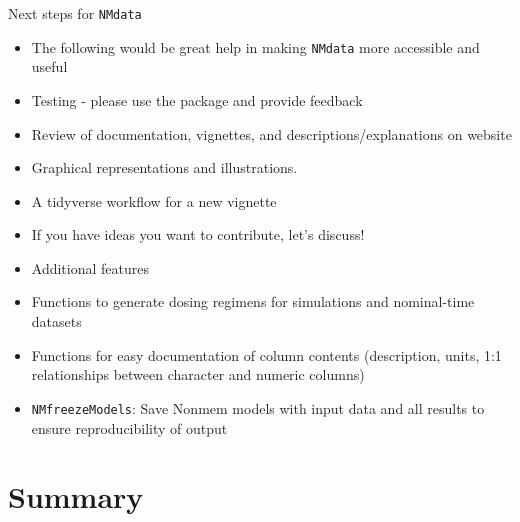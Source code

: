 \documentclass[
  8pt,
  ignorenonframetext,
  aspectratio=169]{beamer}
\begin{document}
\begin{frame}[fragile]{Next steps for \texttt{NMdata}}
\protect\hypertarget{next-steps-for-nmdata-1}{}
\begin{itemize}
\item
  The following would be great help in making \texttt{NMdata} more
  accessible and useful
\item
  Testing - please use the package and provide feedback
\item
  Review of documentation, vignettes, and descriptions/explanations on
  website
\item
  Graphical representations and illustrations.
\item
  A tidyverse workflow for a new vignette
\item
  If you have ideas you want to contribute, let's discuss!
\item
  Additional features
\item
  Functions to generate dosing regimens for simulations and nominal-time
  datasets
\item
  Functions for easy documentation of column contents (description,
  units, 1:1 relationships between character and numeric columns)
\item
  \texttt{NMfreezeModels}: Save Nonmem models with input data and all
  results to ensure reproducibility of output
\end{itemize}
\end{frame}

\hypertarget{summary}{%
\section{Summary}\label{summary}}
\end{document}
